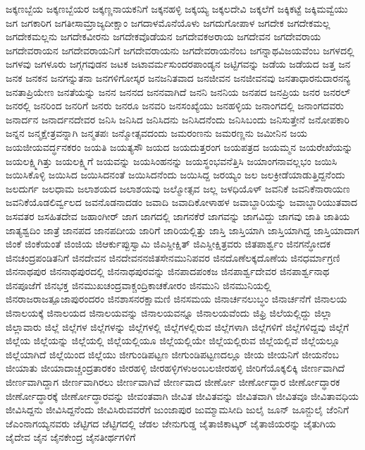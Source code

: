 {ಜಕ್ಕಣಬ್ಬೆಯ
ಜಕ್ಕಣಬ್ಬೆಯರ
ಜಕ್ಕಣ್ಣನಾಯಕನಿಗೆ
ಜಕ್ಕನಹಳ್ಳಿ
ಜಕ್ಕಯ್ಯ
ಜಕ್ಕಲದೇವಿ
ಜಕ್ಕಲೆಗೆ
ಜಕ್ಕಿಕಟ್ಟೆ
ಜಕ್ಕಿಮವ್ವೆಯು
ಜಗ
ಜಗಕಾರಿಗ
ಜಗತೀಸಾಮ್ರಾಜ್ಯದೀಕ್ಷಾಂ
ಜಗದಾಳಮೊನೆಯೊಳು
ಜಗದುಗೋಪಾಳ
ಜಗದೇಕ
ಜಗದೇಕಮಲ್ಲ
ಜಗದೇಕಮಲ್ಲನು
ಜಗದೇಕವೀರನು
ಜಗದೇಕವೊಡೆಯನ
ಜಗದೇವಕಅರಾಯ
ಜಗದೇವನ
ಜಗದೇವರಾಯ
ಜಗದೇವರಾಯನ
ಜಗದೇವರಾಯನಿಗೆ
ಜಗದೇವರಾಯನು
ಜಗದೇವರಾಯನೆಂಬ
ಜಗನ್ನಾಥವಿಜಯವೆಂಬ
ಜಗಳದಲ್ಲಿ
ಜಗಳವು
ಜಗಳೂರು
ಜಗ್ಗಗವುಡನ
ಜಟಕ
ಜಟಾವರ್ಮಸುಂದರಪಾಂಡ್ಯನ
ಜಟ್ಟಿಗವನ್ನು
ಜಡೆಯ
ಜಡೆಯದ
ಜತ್ತ
ಜನ
ಜನಕ
ಜನಕನ
ಜನಗನ್ನುತನಾ
ಜನಗಳಿಗೋಸ್ಕರ
ಜನಜನಿತವಾದ
ಜನಜೀವನ
ಜನಜೀವನವು
ಜನತಾಧಾರನುದಾರನನ್ಯ
ಜನತಾಪ್ರಿಯೇಣ
ಜನತೆಯನ್ನು
ಜನನ
ಜನನದ
ಜನನವಾಗಿದೆ
ಜನನಿ
ಜನನಿಯ
ಜನಪದ
ಜನಪ್ರಿಯ
ಜನರ
ಜನರಲ್
ಜನರಲ್ಲಿ
ಜನರಿಂದ
ಜನರಿಗೆ
ಜನರು
ಜನರೂ
ಜನವರಿ
ಜನಸಂಖ್ಯೆಯು
ಜನಹಳ್ಳಿಯ
ಜನಾಂಗದಲ್ಲಿ
ಜನಾಂಗದವರು
ಜನಾರ್ದನ
ಜನಾರ್ದನದೇವರ
ಜನಿಸಿ
ಜನಿಸಿದ
ಜನಿಸಿದನು
ಜನಿಸಿದನೆಂದು
ಜನಿಸಿಬಂದು
ಜನಿಸುತ್ತೇನೆ
ಜನೋಪಕಾರಿ
ಜನ್ನನ
ಜನ್ಮಕ್ಷೇತ್ರವನ್ನಾಗಿ
ಜನ್ಮತಪಃ
ಜನ್ಮೋತ್ಸವದಂದು
ಜಮರಂಣನು
ಜಮರಣ್ಣನು
ಜಮೀನಿನ
ಜಯ
ಜಯಜೀಯವರ್ದ್ಧನಕರಂ
ಜಯತಿ
ಜಯತ್ಯಸೌ
ಜಯದ
ಜಯದುತ್ತರಂಗ
ಜಯಪತ್ರದ
ಜಯಮ್ಮನ
ಜಯರೇಖೆಯನ್ನು
ಜಯಲಕ್ಷ್ಮಿಗಿತ್ತು
ಜಯಲಕ್ಷ್ಮಿಗೆ
ಜಯವನ್ನು
ಜಯಸಿಂಹನನ್ನು
ಜಯಸ್ಥಂಭವನೆತ್ತಿಸಿ
ಜಯಾಂಗನಾವಲ್ಲಭಂ
ಜಯಿಸಿ
ಜಯಿಸಿಕೊಳ್ಳಿ
ಜಯಿಸಿದ
ಜಯಿಸಿದನಂತೆ
ಜಯಿಸಿದನೆಂದು
ಜಯಿಸಿದ್ದ
ಜರಯ್ಯಂ
ಜಲ
ಜಲಕ್ರೀಡೆಯಾಡುತ್ತಿದ್ದನೆಂದು
ಜಲದುರ್ಗ
ಜಲಧಾಮ
ಜಲಾಶಯದ
ಜಲಾಶಯವು
ಜಲ್ಮೋತ್ಸವ
ಜಲ್ಲ
ಜಳಧಿಯೊಳ್
ಜವನಿಕೆ
ಜವನಿಕೆನಾರಾಯಣ
ಜವನಿಕೆಯೊಡಲಿರ್ವ್ವಲದ
ಜವನೊಡನಾದಡಂ
ಜವಾದಿ
ಜವಾದಿಕೋಳಾಹಳ
ಜವಾಬ್ದಾರಿಯನ್ನು
ಜವಾಬ್ದಾರಿಯುತವಾದ
ಜಸವತರ
ಜಸಹಿತದೇವ
ಜಹಾಂಗೀರ್
ಜಾಗ
ಜಾಗದಲ್ಲಿ
ಜಾಗನಕೆರೆ
ಜಾಗವನ್ನು
ಜಾಗವಿದ್ದು
ಜಾಗವು
ಜಾತಿ
ಜಾತಿಯ
ಜಾತ್ಯಶ್ವದಿಂ
ಜಾತ್ರೆ
ಜಾನಪದ
ಜಾನಪದೀಯ
ಜಾರಿಗೆ
ಜಾರಿಯಲ್ಲಿತ್ತು
ಜಾಸ್ತಿ
ಜಾಸ್ತಿಯಾಗಿ
ಜಾಸ್ತಿಯಾಗಿದ್ದ
ಜಾಸ್ತಿಯಾದಾಗ
ಜಿಂಕೆ
ಜಿಂಕೆಯಂತೆ
ಜಿಂಜಿಯ
ಜಿಆರ್ಕುಪ್ಪುಸ್ವಾಮಿ
ಜಿಎಸ್ದೀಕ್ಷಿತ್
ಜಿಎಸ್ದೀಕ್ಷಿತ್ರವರು
ಜಿತಪಾರ್ಶ್ವಂ
ಜಿನಗನ್ಧೋದಕ
ಜಿನಚಂದ್ರಪಂಡಿತನಿಗೆ
ಜಿನದೇವನ
ಜಿನದೇವನನಜಿತಸೇನಮುನಿಪವರ
ಜಿನದೊಣೆಲಕ್ಕದೊಣೆಯ
ಜಿನಧರ್ಮಾಗ್ರಣಿ
ಜಿನನಾಥಪುರ
ಜಿನನಾಥಪುರದಲ್ಲಿ
ಜಿನನಾಥಪುರವನ್ನು
ಜಿನಪಾದಪಂಕಜ
ಜಿನಪಾರ್ಶ್ವದೇವರ
ಜಿನಪಾರ್ಶ್ವನಾಥ
ಜಿನಪೂಜೆಗೆ
ಜಿನಭಕ್ತ
ಜಿನಮುಖಚಂದ್ರವಾಕ್ಚಂದ್ರಿಕಾಚಕೋರಂ
ಜಿನಮುನಿ
ಜಿನಮುನಿಯಲ್ಲಿ
ಜಿನರಾಜರಾಜತ್ಪೂಜಾಪುರಂದರಂ
ಜಿನಶಾಸನರಕ್ಷಾಮಣಿ
ಜಿನಸಮಯ
ಜಿನಾರ್ಚನಲುಬ್ಧಂ
ಜಿನಾರ್ಚನೆಗೆ
ಜಿನಾಲಯ
ಜಿನಾಲಯಕ್ಕೆ
ಜಿನಾಲಯದ
ಜಿನಾಲಯವನ್ನು
ಜಿನಾಲಯವನ್ನೂ
ಜಿನಾಲಯವೆಂದು
ಜಿಫ್ರಿ
ಜಿಲೆಯಲ್ಲಿದ್ದು
ಜಿಲ್ಲಾ
ಜಿಲ್ಲಾವಾರು
ಜಿಲ್ಲೆ
ಜಿಲ್ಲೆಗಳ
ಜಿಲ್ಲೆಗಳನ್ನು
ಜಿಲ್ಲೆಗಳಲ್ಲಿ
ಜಿಲ್ಲೆಗಳಲ್ಲಿರುವ
ಜಿಲ್ಲೆಗಳಾಗಿ
ಜಿಲ್ಲೆಗಳಿಗೆ
ಜಿಲ್ಲೆಗಳಿದ್ದವು
ಜಿಲ್ಲೆಗೆ
ಜಿಲ್ಲೆಯ
ಜಿಲ್ಲೆಯನ್ನು
ಜಿಲ್ಲೆಯಲ್ಲಿ
ಜಿಲ್ಲೆಯಲ್ಲಿಯೂ
ಜಿಲ್ಲೆಯಲ್ಲಿಯೇ
ಜಿಲ್ಲೆಯಲ್ಲಿರುವ
ಜಿಲ್ಲೆಯಲ್ಲಿವೆ
ಜಿಲ್ಲೆಯಲ್ಲೂ
ಜಿಲ್ಲೆಯಾಗಿದೆ
ಜಿಲ್ಲೆಯಿಂದ
ಜಿಲ್ಲೆಯು
ಜೀಗುಂಡಿಪಟ್ಟಣ
ಜೀಗುಂಡಿಪಟ್ಟಣದಲ್ಲೂ
ಜೀಯ
ಜೀಯನಿಗೆ
ಜೀಯನೆಂಬ
ಜೀಯಾತು
ಜೀಯಾದಾಚ್ಚಂದ್ರತಾರಕಂ
ಜೀರಹಳ್ಳಿ
ಜೀರಹಳ್ಳಿಗಳುಅಂಬಲಜೀರಹಳ್ಳಿ
ಜೀರಿಗೆಯೊಕ್ಕಲಿಕ್ಕಿ
ಜೀರ್ಣವಾಗಿದೆ
ಜೀರ್ಣವಾಗಿದ್ದಾಗ
ಜೀರ್ಣವಾಗಿರಲು
ಜೀರ್ಣವಾಗಿವೆ
ಜೀರ್ಣವಾದ
ಜೀರ್ಣೋ
ಜೀರ್ಣೋದ್ಧಾರ
ಜೀರ್ಣೋದ್ಧಾರಕ
ಜೀರ್ಣೋದ್ಧಾರಕ್ಕೆ
ಜೀರ್ಣೋದ್ಧಾರವನ್ನು
ಜೀವಂತವಾಗಿ
ಜೀವಿತ
ಜೀವಿತವನ್ನು
ಜೀವಿತವಾಗಿ
ಜೀವಿತವೂ
ಜೀವಿತಾವಧಿಯ
ಜೀವಿಸಿದ್ದನು
ಜೀವಿಸಿದ್ದನೆಂದು
ಜೀವಿಸಿರುವವರೆಗೆ
ಜುಂಜಾಪುರ
ಜುಮ್ಮಾಮಸೀದಿ
ಜುಲೈ
ಜೂನ್
ಜೂನ್ಜುಲೈ
ಜೆಂನಿಗೆ
ಜೆಎಂನಾಗಯ್ಯನವರು
ಜೆಟ್ಟಿಗದ
ಜೆಟ್ಟಿಗದಲ್ಲಿ
ಜೆಡಲ
ಜೇನುಗುಡ್ಡ
ಜೈತಾಜಿಕಾಟ್ಕರ್
ಜೈತಾಜಿಯರನ್ನು
ಜೈತುಗಿಯ
ಜೈದೇವ
ಜೈನ
ಜೈನಕೇಂದ್ರ
ಜೈನತೀರ್ಥಗಳಿಗೆ
}
